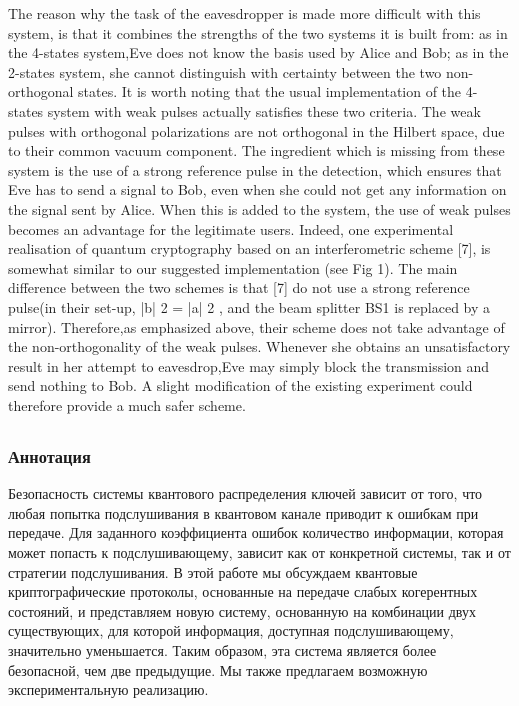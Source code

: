 The reason why the task of the eavesdropper is made more difficult with this system, is that it combines the strengths of the two systems it is built from: as in the 4-states system,Eve does not know the basis used by Alice and Bob; as in the 2-states system, she cannot distinguish with certainty between the two non-orthogonal states. It is worth noting that the usual implementation of the 4-states system with weak pulses actually satisfies these two criteria. The weak pulses with orthogonal polarizations are not orthogonal in the Hilbert space, due to their common vacuum component. The ingredient which is missing from these system is the use of a strong reference pulse in the detection, which ensures that Eve has to send a signal to Bob, even when she could not get any information on the signal sent by Alice. When this is added to the system, the use of weak pulses becomes an advantage for the legitimate users. Indeed, one experimental realisation of quantum cryptography based on an interferometric scheme [7], is somewhat similar to our suggested implementation (see Fig 1). The main difference between the two schemes is that [7] do not use a strong reference pulse(in their set-up, |b| 2 = |a| 2 , and the beam splitter BS1 is replaced by a mirror). Therefore,as emphasized above, their scheme does not take advantage of the non-orthogonality of the weak pulses. Whenever she obtains an unsatisfactory result in her attempt to eavesdrop,Eve may simply block the transmission and send nothing to Bob. A slight modification of the existing experiment could therefore provide a much safer scheme.

\subsection{\trnas}


\subsubsection*{Аннотация}
Безопасность системы квантового распределения ключей зависит от того, что любая попытка подслушивания в квантовом канале приводит к ошибкам при передаче. Для заданного коэффициента ошибок количество информации, которая может попасть к подслушивающему, зависит как от конкретной системы, так и от стратегии подслушивания. В этой работе мы обсуждаем квантовые криптографические протоколы, основанные на передаче слабых когерентных состояний, и представляем новую систему, основанную на комбинации двух существующих, для которой информация, доступная подслушивающему, значительно уменьшается. Таким образом, эта система является более безопасной, чем две предыдущие. Мы также предлагаем возможную экспериментальную реализацию.

